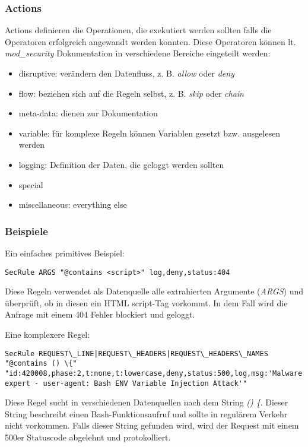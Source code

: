 \subsubsection{Actions}

Actions definieren die Operationen, die exekutiert werden sollten falls die Operatoren erfolgreich angewandt werden konnten. Diese Operatoren können lt. \textit{mod\_security} Dokumentation in verschiedene Bereiche eingeteilt werden:

\begin{itemize}
	\item disruptive: verändern den Datenfluss, z. B. \textit{allow} oder \textit{deny}
	\item flow: beziehen sich auf die Regeln selbst, z. B. \textit{skip} oder \textit{chain}
	\item meta-data: dienen zur Dokumentation
	\item variable: für komplexe Regeln können Variablen gesetzt bzw. ausgelesen werden
	\item logging: Definition der Daten, die geloggt werden sollten
	\item special
	\item miscellaneous: everything else
\end{itemize}

\subsubsection{Beispiele}

Ein einfaches primitives Beispiel:

\begin{verbatim}
SecRule ARGS "@contains <script>" log,deny,status:404
\end{verbatim}

Diese Regeln verwendet als Datenquelle alle extrahierten Argumente (\textit{ARGS}) und überprüft, ob in diesen ein HTML script-Tag vorkommt. In dem Fall wird die Anfrage mit einem 404 Fehler blockiert und geloggt.

Eine komplexere Regel:

\begin{verbatim}
SecRule REQUEST\_LINE|REQUEST\_HEADERS|REQUEST\_HEADERS\_NAMES "@contains () \{" "id:420008,phase:2,t:none,t:lowercase,deny,status:500,log,msg:'Malware expert - user-agent: Bash ENV Variable Injection Attack'"
\end{verbatim}

Diese Regel sucht in verschiedenen Datenquellen nach dem String \textit{() \{}. Dieser String beschreibt einen Bash-Funktionsaufruf und sollte in regulärem Verkehr nicht vorkommen. Falls dieser String gefunden wird, wird der Request mit einem 500er Statuscode abgelehnt und protokolliert.

